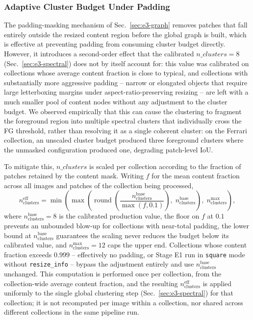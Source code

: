 \subsubsection{Adaptive Cluster Budget Under Padding}
\label{sec:e3-adaptive-clusters}

The padding-masking mechanism of Sec.~\ref{sec:e3-graph} removes patches that fall entirely outside the resized content region before the global graph is built, which is effective at preventing padding from consuming cluster budget directly. However, it introduces a second-order effect that the calibrated $n\_clusters=8$ (Sec.~\ref{sec:e3-spectral}) does not by itself account for: this value was calibrated on collections whose average content fraction is close to typical, and collections with substantially more aggressive padding -- narrow or elongated objects that require large letterboxing margins under aspect-ratio-preserving resizing -- are left with a much smaller pool of content nodes without any adjustment to the cluster budget. We observed empirically that this can cause the clustering to fragment the foreground region into multiple spectral clusters that individually cross the FG threshold, rather than resolving it as a single coherent cluster: on the Ferrari collection, an unscaled cluster budget produced three foreground clusters where the unmasked configuration produced one, degrading patch-level IoU.

To mitigate this, $n\_clusters$ is scaled per collection according to the fraction of patches retained by the content mask. Writing $f$ for the mean content fraction across all images and patches of the collection being processed,
\[
n_{\text{clusters}}^{\text{eff}} = \min\!\left(\max\!\left(\operatorname{round}\!\left(\frac{n_{\text{clusters}}^{\text{base}}}{\max(f, 0.1)}\right),\; n_{\text{clusters}}^{\text{base}}\right),\; n_{\text{clusters}}^{\max}\right),
\]
where $n_{\text{clusters}}^{\text{base}}=8$ is the calibrated production value, the floor on $f$ at $0.1$ prevents an unbounded blow-up for collections with near-total padding, the lower bound at $n_{\text{clusters}}^{\text{base}}$ guarantees the scaling never reduces the budget below its calibrated value, and $n_{\text{clusters}}^{\max}=12$ caps the upper end. Collections whose content fraction exceeds $0.999$ -- effectively no padding, or Stage E1 run in \texttt{square} mode without \texttt{resize\_info} -- bypass the adjustment entirely and use $n_{\text{clusters}}^{\text{base}}$ unchanged. This computation is performed once per collection, from the collection-wide average content fraction, and the resulting $n_{\text{clusters}}^{\text{eff}}$ is applied uniformly to the single global clustering step (Sec.~\ref{sec:e3-spectral}) for that collection; it is not recomputed per image within a collection, nor shared across different collections in the same pipeline run.


